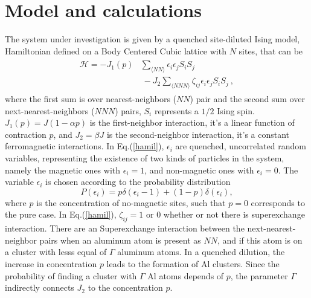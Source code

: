 \documentclass[twocolumn,5p,12pt]{elsarticle}
\begin{document}
\section{Model and calculations}
The system under investigation is given by a quenched site-diluted Ising model, Hamiltonian defined on a Body Centered Cubic lattice with $N$ sites, that can be
\begin{eqnarray}\label{hamil}
\begin{split}
\mathcal{H} =-J_1(p)&\sum_{\langle NN\rangle} \epsilon_i \epsilon_jS_{i}S_{j} \\& ~- J_{2}\sum_{\langle NNN \rangle}\zeta_{ij}  \epsilon_i \epsilon_j S_{i}S_{j}
~,
\end{split}
\end{eqnarray}
%
where the first sum is over nearest-neighbors ($NN$) pair and the second sum over next-nearest-neighbors ($NNN$) pairs, $S_i$ represents a $1/2$ Ising spin. $J_1(p)=J(1- \alpha p)$ is the first-neighbor interaction, it’s a linear function of contraction $p$, and $J_2=\beta J$ is the second-neighbor interaction, it’s a constant ferromagnetic interactions. In Eq.(\ref{hamil}), $\epsilon_i$ are quenched, uncorrelated random variables, representing the existence of two kinds of particles in the system, namely the magnetic ones with $\epsilon_i=1$, and non-magnetic ones with $\epsilon_i=0$. The variable $\epsilon_i$ is chosen according to the probability distribution
%
\begin{equation}
P(\epsilon_i) = p\delta(\epsilon_i-1) + (1-p)\delta(\epsilon_i),
\label{pro}
\end{equation}
%
where $p$ is the concentration of no-magnetic sites, such that $p = 0$ corresponds to the pure case. In Eq.(\ref{hamil}),  $\zeta_{ij}=1$ or $0$ whether or not there is superexchange interaction. There are an Superexchange interaction between the next-nearest-neighbor pairs when an aluminum atom is present as $NN$, and if this atom is on a cluster with lesss equal of $\Gamma$ aluminum atoms. In a quenched dilution, the increase in concentration $p$ leads to the formation of Al clusters. Since the probability of finding a cluster with $\Gamma$ Al atoms depends of $p$, the parameter $\Gamma$ indirectly connects $J_2$ to the concentration $p$.
\end{document}
